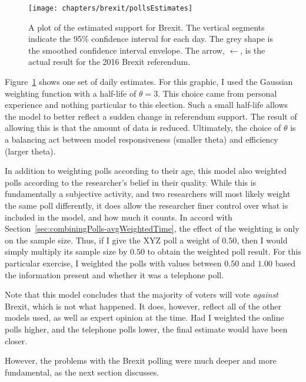 \begin{figure}\centering
 \texttt{[image: chapters/brexit/pollsEstimates]}
 \caption[Estimated Brexit support]{A plot of the estimated support for Brexit. The vertical segments indicate the 95\% confidence interval for each day. The grey shape is the smoothed confidence interval envelope. The arrow, $\leftarrow$, is the actual result for the 2016 Brexit referendum.}
 \label{fig:brexit-pollsEstimates}
\end{figure}

Figure~\ref{fig:brexit-pollsEstimates} shows one set of daily estimates. For this graphic, I used the Gaussian weighting function with a half-life of $\theta=3$. This choice came from personal experience and nothing particular to this election. Such a small half-life allows the model to better reflect a sudden change in referendum support. The result of allowing this is that the amount of data is reduced. Ultimately, the choice of $\theta$ is a balancing act between model responsiveness (smaller theta) and efficiency (larger theta).

In addition to weighting polls according to their age, this model also weighted polls according to the researcher's belief in their quality. While this is fundamentally a subjective activity, and two researchers will most likely weight the same poll differently, it does allow the researcher finer control over what is included in the model, and how much it counts. In accord with Section~\ref{sec:combiningPolls-avgWeightedTime}, the effect of the weighting is only on the sample size. Thus, if I give the XYZ poll a weight of $0.50$, then I would simply multiply its sample size by $0.50$ to obtain the weighted poll result. For this particular exercise, I weighted the polls with values between $0.50$ and $1.00$ based the information present and whether it was a telephone poll.


Note that this model concludes that the majority of voters will vote \emph{against} Brexit, which is not what happened. It does, however, reflect all of the other models used, as well as expert opinion at the time.\cite{erlanger-2016} Had I weighted the online polls higher, and the telephone polls lower, the final estimate would have been closer.

However, the problems with the Brexit polling were much deeper and more fundamental, as the next section discusses.













